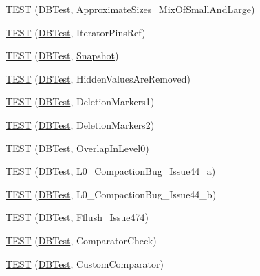 \begin{DoxyCompactItemize}
\item 
\mbox{\hyperlink{namespaceleveldb_a5c41c70ccd20279235316b8627f419da}{T\+E\+ST}} (\mbox{\hyperlink{classleveldb_1_1_d_b_test}{D\+B\+Test}}, Approximate\+Sizes\+\_\+\+Mix\+Of\+Small\+And\+Large)
\item 
\mbox{\hyperlink{namespaceleveldb_a899f7415195fa4d25d801246cdec721d}{T\+E\+ST}} (\mbox{\hyperlink{classleveldb_1_1_d_b_test}{D\+B\+Test}}, Iterator\+Pins\+Ref)
\item 
\mbox{\hyperlink{namespaceleveldb_ab09998970d1ace06b8082f49da0444f5}{T\+E\+ST}} (\mbox{\hyperlink{classleveldb_1_1_d_b_test}{D\+B\+Test}}, \mbox{\hyperlink{classleveldb_1_1_snapshot}{Snapshot}})
\item 
\mbox{\hyperlink{namespaceleveldb_a94214aebbf6328e7ad9ba735c5e42f68}{T\+E\+ST}} (\mbox{\hyperlink{classleveldb_1_1_d_b_test}{D\+B\+Test}}, Hidden\+Values\+Are\+Removed)
\item 
\mbox{\hyperlink{namespaceleveldb_a216168df3713bb71f35038d91b5224f0}{T\+E\+ST}} (\mbox{\hyperlink{classleveldb_1_1_d_b_test}{D\+B\+Test}}, Deletion\+Markers1)
\item 
\mbox{\hyperlink{namespaceleveldb_a4188787b0b1e1e25475a2983374065b6}{T\+E\+ST}} (\mbox{\hyperlink{classleveldb_1_1_d_b_test}{D\+B\+Test}}, Deletion\+Markers2)
\item 
\mbox{\hyperlink{namespaceleveldb_a4fa4ffaab998ba44a1745937c1e9c55c}{T\+E\+ST}} (\mbox{\hyperlink{classleveldb_1_1_d_b_test}{D\+B\+Test}}, Overlap\+In\+Level0)
\item 
\mbox{\hyperlink{namespaceleveldb_a46665ff2f4f9bd25167f82d3be16f8b2}{T\+E\+ST}} (\mbox{\hyperlink{classleveldb_1_1_d_b_test}{D\+B\+Test}}, L0\+\_\+\+Compaction\+Bug\+\_\+\+Issue44\+\_\+a)
\item 
\mbox{\hyperlink{namespaceleveldb_a727df67090c63a0ca4b2effdc90a3da1}{T\+E\+ST}} (\mbox{\hyperlink{classleveldb_1_1_d_b_test}{D\+B\+Test}}, L0\+\_\+\+Compaction\+Bug\+\_\+\+Issue44\+\_\+b)
\item 
\mbox{\hyperlink{namespaceleveldb_a22da7a44e3ed1367424a9eb96cca43a4}{T\+E\+ST}} (\mbox{\hyperlink{classleveldb_1_1_d_b_test}{D\+B\+Test}}, Fflush\+\_\+\+Issue474)
\item 
\mbox{\hyperlink{namespaceleveldb_a5cd6c2754610c66f4dd998874482c80b}{T\+E\+ST}} (\mbox{\hyperlink{classleveldb_1_1_d_b_test}{D\+B\+Test}}, Comparator\+Check)
\item 
\mbox{\hyperlink{namespaceleveldb_a38772a8b86ea7658430b1fa2f1a5d83e}{T\+E\+ST}} (\mbox{\hyperlink{classleveldb_1_1_d_b_test}{D\+B\+Test}}, Custom\+Comparator)

\end{DoxyCompactItemize}
